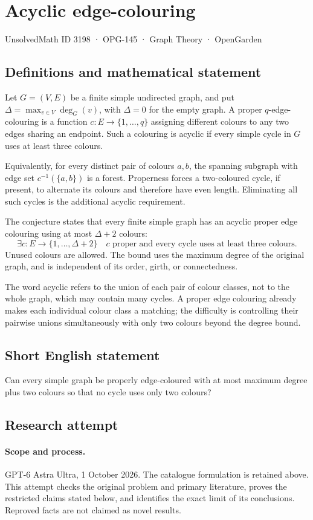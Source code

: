 \documentclass[11pt,a4paper]{article}
\begin{document}
\section*{Acyclic edge-colouring}\label{3198}
{\small UnsolvedMath ID 3198 · OPG-145 · Graph Theory · OpenGarden}
\subsection{Definitions and mathematical statement}
Let $G=(V,E)$ be a finite simple undirected graph,
and put $\Delta=\max_{v\in V}\deg_G(v)$, with
$\Delta=0$ for the empty graph. A proper
$q$-edge-colouring is a function
$c:E\to\{1,\ldots,q\}$ assigning different
colours to any two edges sharing an endpoint.
Such a colouring is acyclic if every simple
cycle in $G$ uses at least three colours.

Equivalently, for every distinct pair of
colours $a,b$, the spanning subgraph with
edge set $c^{-1}(\{a,b\})$ is a forest.
Properness forces a two-coloured cycle,
if present, to alternate its colours and
therefore have even length. Eliminating
all such cycles is the additional acyclic
requirement.

The conjecture states that every finite
simple graph has an acyclic proper edge
colouring using at most $\Delta+2$ colours:
\[
 \exists c:E\to\{1,\ldots,\Delta+2\}
 \quad c\text{ proper and every cycle uses at least three colours}.
\]
Unused colours are allowed. The bound uses
the maximum degree of the original graph,
and is independent of its order, girth,
or connectedness.

The word acyclic refers to the union of
each pair of colour classes, not to the
whole graph, which may contain many cycles.
A proper edge colouring already makes
each individual colour class a matching;
the difficulty is controlling their pairwise
unions simultaneously with only two colours
beyond the degree bound.
\subsection{Short English statement}
Can every simple graph be properly edge-coloured with at most maximum degree plus two colours so that no cycle uses only two colours?
\subsection{Research attempt}
\paragraph{Scope and process.}
GPT-6 Astra Ultra, 1 October 2026. The catalogue formulation is retained above. This attempt checks the original problem and primary literature, proves the restricted claims stated below, and identifies the exact limit of its conclusions. Reproved facts are not claimed as novel results.
\end{document}
